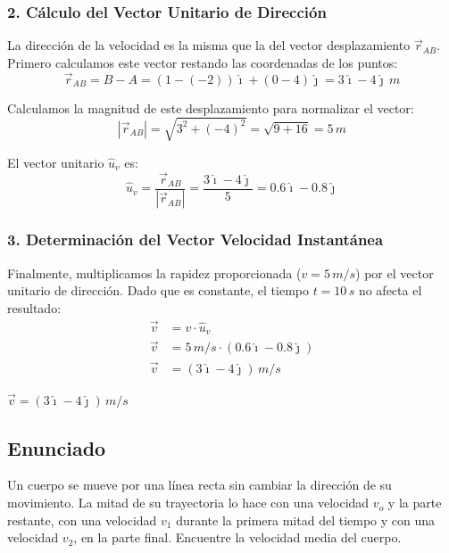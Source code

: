 \documentclass[12pt, a4paper]{article}
\begin{document}
\subsubsection*{2. Cálculo del Vector Unitario de Dirección}

La dirección de la velocidad es la misma que la del vector desplazamiento $\vec{r}_{AB}$. Primero calculamos este vector restando las coordenadas de los puntos:
\begin{equation}
    \vec{r}_{AB} = B - A = (1 - (-2))\hat{\imath} + (0 - 4)\hat{\jmath} = 3\hat{\imath} - 4\hat{\jmath} \, \si{m}
\end{equation}

Calculamos la magnitud de este desplazamiento para normalizar el vector:
\begin{equation}
    |\vec{r}_{AB}| = \sqrt{3^2 + (-4)^2} = \sqrt{9 + 16} = 5 \, \si{m}
\end{equation}

El vector unitario $\hat{u}_v$ es:
\begin{equation}
    \hat{u}_v = \frac{\vec{r}_{AB}}{|\vec{r}_{AB}|} = \frac{3\hat{\imath} - 4\hat{\jmath}}{5} = 0.6\hat{\imath} - 0.8\hat{\jmath}
\end{equation}

\subsubsection*{3. Determinación del Vector Velocidad Instantánea}

Finalmente, multiplicamos la rapidez proporcionada ($v = 5 \, \si{m/s}$) por el vector unitario de dirección. Dado que es constante, el tiempo $t = 10 \, \si{s}$ no afecta el resultado:
\begin{align*}
    \vec{v} &= v \cdot \hat{u}_v \\
    \vec{v} &= 5 \, \si{m/s} \cdot (0.6\hat{\imath} - 0.8\hat{\jmath}) \\
    \vec{v} &= (3\hat{\imath} - 4\hat{\jmath}) \, \si{m/s}
\end{align*}

\begin{tcolorbox}[colback=blue!5!white, colframe=blue!75!black, title=Respuesta Final]
\centering
$\vec{v} = (3\hat{\imath} - 4\hat{\jmath}) \, \si{m/s}$
\end{tcolorbox}

\newpage
\subsection*{Enunciado}
Un cuerpo se mueve por una línea recta sin cambiar la dirección de su movimiento. La mitad de su trayectoria lo hace con una velocidad $v_o$ y la parte restante, con una velocidad $v_1$ durante la primera mitad del tiempo y con una velocidad $v_2$, en la parte final. Encuentre la velocidad media del cuerpo.
\end{document}

